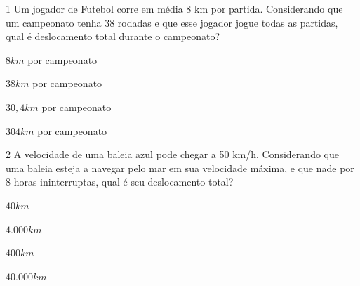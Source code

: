 {{\num{1} Um jogador de Futebol corre em média 8 km por partida. Considerando
que um campeonato tenha 38 rodadas e que esse jogador jogue todas as
partidas, qual é deslocamento total durante o campeonato?

\begin{escolha}[itemsep=0pt]
\item $8 km$ por campeonato
\item $38 km$ por campeonato
\item $30,4 km$ por campeonato
\item $304 km$ por campeonato 
\end{escolha}







\num{2} A velocidade de uma baleia azul pode chegar a 50 km/h. Considerando
que uma baleia esteja a navegar pelo mar em sua velocidade máxima, e que
nade por 8 horas ininterruptas, qual é seu deslocamento total?

\begin{escolha}[itemsep=0pt]
\item $40 km$
\item $4.000 km$
\item $400 km$ 
\item $40.000 km$
\end{escolha}



}}
